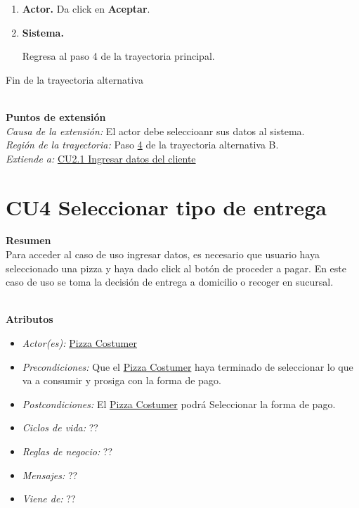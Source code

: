 \begin{itemize}
\begin{enumerate}
				\item \textbf{Actor.} Da click en \textbf{Aceptar}.
				
				\item \hypertarget{CU1:TAB:P4} {\textbf{Sistema.}} Regresa al paso 4 de la trayectoria principal.
	
			\end{enumerate}
			
			Fin de la trayectoria alternativa
		

	\end{itemize}

	\noindent \textbf{\\Puntos de extensión}\\

		\noindent \textit{Causa de la extensión:} El actor debe seleccioanr sus datos al sistema.\\
		\textit{Región de la trayectoria:} Paso \hyperlink{CU1:TAB:P4}{4} de la trayectoria alternativa B.\\
		\textit{Extiende a:} \hyperlink{CU2.1}{CU2.1 Ingresar datos del cliente}\\

		
\section{CU4 Seleccionar tipo de entrega}

\noindent \textbf{Resumen}\\

Para acceder al caso de uso ingresar datos, es necesario que usuario haya seleccionado una pizza y haya dado click al botón de proceder a pagar. En este caso de uso se toma la decisión de entrega a domicilio o recoger en sucursal.

\noindent \textbf{\\Atributos}

\begin{itemize}
	
	\item \textit{Actor(es):} \hyperlink{A:Pizza Costumer}{Pizza Costumer}
	\item \textit{Precondiciones:} Que el \hyperlink{A:Pizza Costumer}{Pizza Costumer} haya terminado de seleccionar lo que va a consumir y prosiga con la forma de pago. 
	\item \textit{Postcondiciones:} El \hyperlink{A:Pizza Costumer}{Pizza Costumer} podrá Seleccionar la forma de pago.
	\item \textit{Ciclos de vida:} ??
	\item \textit{Reglas de negocio:} ??
	\item \textit{Mensajes:} ??
	\item \textit{Viene de:} ??
	
\end{itemize} 

